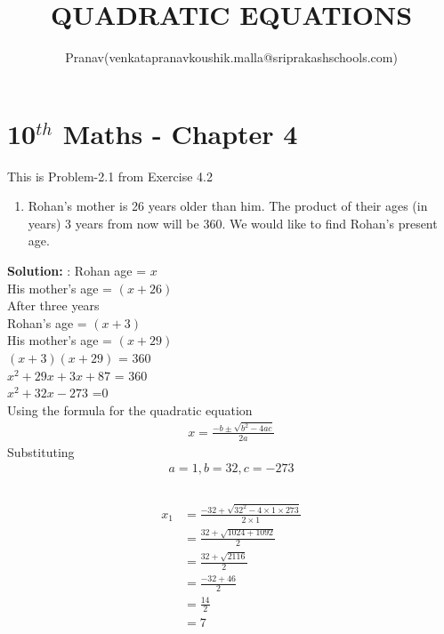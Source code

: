 \documentclass[10pt]{article}
\title{QUADRATIC EQUATIONS}
\author{Pranav(venkatapranavkoushik.malla@sriprakashschools.com)}
\newcommand{\solution}{\noindent \textbf{Solution: }}
\begin{document}
    \maketitle
    \section*{10$^{th}$ Maths - Chapter 4}
    This is Problem-2.1 from Exercise 4.2
\begin{enumerate}
    \item Rohan’s mother is 26 years older than him. The product of their ages (in years)
3 years from now will be 360. We would like to find Rohan’s present age.
\end{enumerate}
\solution: Rohan age = $x$\\
His mother's age = $(x+26)$\\
After three years\\
Rohan's age = $(x+3)$\\
His mother's age = $(x+29)$\\ 
$(x+3)(x+29)$ = 360\\
$x^2+29x+3x+87$ = 360\\
$x^2+32x-273$ =0\\
Using the formula for the quadratic equation
\begin{align}
x = \frac{-b \pm \sqrt{b^2-4ac}}{2a}
\end{align}
Substituting
\begin{align}
a=1,b=32,c=-273\\
\end{align}
\\
\begin{align}
x_1 &= \frac{-32+\sqrt{32^2-4\times 1 \times 273}}{2\times 1}\\
 &= \frac{32+\sqrt{1024+1092}}{2}\\
 &= \frac{32+\sqrt{2116}}{2}\\
 &= \frac{-32+46}{2}\\
 &= \frac{14}{2}\\
 &= 7
\end{align}
\end{document}

